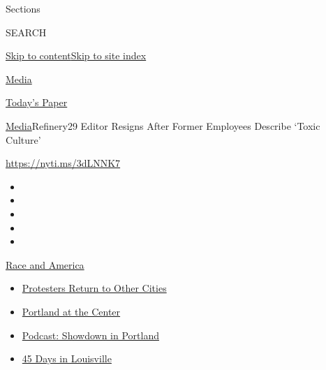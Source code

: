 Sections

SEARCH

\protect\hyperlink{site-content}{Skip to
content}\protect\hyperlink{site-index}{Skip to site index}

\href{https://www.nytimes3xbfgragh.onion/section/business/media}{Media}

\href{https://myaccount.nytimes3xbfgragh.onion/auth/login?response_type=cookie\&client_id=vi}{}

\href{https://www.nytimes3xbfgragh.onion/section/todayspaper}{Today's
Paper}

\href{/section/business/media}{Media}\textbar{}Refinery29 Editor Resigns
After Former Employees Describe `Toxic Culture'

\url{https://nyti.ms/3dLNNK7}

\begin{itemize}
\item
\item
\item
\item
\item
\end{itemize}

\href{https://www.nytimes3xbfgragh.onion/news-event/george-floyd-protests-minneapolis-new-york-los-angeles?action=click\&pgtype=Article\&state=default\&region=TOP_BANNER\&context=storylines_menu}{Race
and America}

\begin{itemize}
\tightlist
\item
  \href{https://www.nytimes3xbfgragh.onion/2020/07/26/us/protests-portland-seattle-trump.html?action=click\&pgtype=Article\&state=default\&region=TOP_BANNER\&context=storylines_menu}{Protesters
  Return to Other Cities}
\item
  \href{https://www.nytimes3xbfgragh.onion/2020/07/24/us/portland-oregon-protests-white-race.html?action=click\&pgtype=Article\&state=default\&region=TOP_BANNER\&context=storylines_menu}{Portland
  at the Center}
\item
  \href{https://www.nytimes3xbfgragh.onion/2020/07/23/podcasts/the-daily/portland-protests.html?action=click\&pgtype=Article\&state=default\&region=TOP_BANNER\&context=storylines_menu}{Podcast:
  Showdown in Portland}
\item
  \href{https://www.nytimes3xbfgragh.onion/interactive/2020/07/16/us/black-lives-matter-protests-louisville-breonna-taylor.html?action=click\&pgtype=Article\&state=default\&region=TOP_BANNER\&context=storylines_menu}{45
  Days in Louisville}
\end{itemize}


